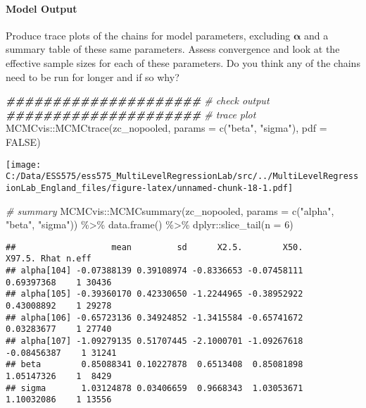 \documentclass[
]{article}
\newenvironment{Shaded}{\begin{snugshade}}{\end{snugshade}}
\newcommand{\AttributeTok}[1]{\textcolor[rgb]{0.77,0.63,0.00}{#1}}
\newcommand{\CommentTok}[1]{\textcolor[rgb]{0.56,0.35,0.01}{\textit{#1}}}
\newcommand{\ConstantTok}[1]{\textcolor[rgb]{0.00,0.00,0.00}{#1}}
\newcommand{\DecValTok}[1]{\textcolor[rgb]{0.00,0.00,0.81}{#1}}
\newcommand{\DocumentationTok}[1]{\textcolor[rgb]{0.56,0.35,0.01}{\textbf{\textit{#1}}}}
\newcommand{\FunctionTok}[1]{\textcolor[rgb]{0.00,0.00,0.00}{#1}}
\newcommand{\NormalTok}[1]{#1}
\newcommand{\SpecialCharTok}[1]{\textcolor[rgb]{0.00,0.00,0.00}{#1}}
\newcommand{\StringTok}[1]{\textcolor[rgb]{0.31,0.60,0.02}{#1}}
\begin{document}
\hypertarget{model-output-1}{%
\paragraph{Model Output}\label{model-output-1}}

Produce trace plots of the chains for model parameters, excluding
\(\boldsymbol{\alpha}\) and a summary table of these same parameters.
Assess convergence and look at the effective sample sizes for each of
these parameters. Do you think any of the chains need to be run for
longer and if so why?

\begin{Shaded}
\begin{Highlighting}[]
\DocumentationTok{\#\#\#\#\#\#\#\#\#\#\#\#\#\#\#\#\#\#\#\#\#}
\CommentTok{\# check output}
\DocumentationTok{\#\#\#\#\#\#\#\#\#\#\#\#\#\#\#\#\#\#\#\#\#}
\CommentTok{\# trace plot}
\NormalTok{MCMCvis}\SpecialCharTok{::}\FunctionTok{MCMCtrace}\NormalTok{(zc\_nopooled, }\AttributeTok{params =} \FunctionTok{c}\NormalTok{(}\StringTok{"beta"}\NormalTok{, }\StringTok{"sigma"}\NormalTok{), }\AttributeTok{pdf =} \ConstantTok{FALSE}\NormalTok{)}
\end{Highlighting}
\end{Shaded}

\texttt{[image: C:/Data/ESS575/ess575\_MultiLevelRegressionLab/src/../MultiLevelRegressionLab\_England\_files/figure-latex/unnamed-chunk-18-1.pdf]}

\begin{Shaded}
\begin{Highlighting}[]
\CommentTok{\# summary}
\NormalTok{MCMCvis}\SpecialCharTok{::}\FunctionTok{MCMCsummary}\NormalTok{(zc\_nopooled, }\AttributeTok{params =} \FunctionTok{c}\NormalTok{(}\StringTok{"alpha"}\NormalTok{, }\StringTok{"beta"}\NormalTok{, }\StringTok{"sigma"}\NormalTok{)) }\SpecialCharTok{\%\textgreater{}\%} 
  \FunctionTok{data.frame}\NormalTok{() }\SpecialCharTok{\%\textgreater{}\%} 
\NormalTok{  dplyr}\SpecialCharTok{::}\FunctionTok{slice\_tail}\NormalTok{(}\AttributeTok{n =} \DecValTok{6}\NormalTok{)}
\end{Highlighting}
\end{Shaded}

\begin{verbatim}
##                   mean         sd      X2.5.        X50.      X97.5. Rhat n.eff
## alpha[104] -0.07388139 0.39108974 -0.8336653 -0.07458111  0.69397368    1 30436
## alpha[105] -0.39360170 0.42330650 -1.2244965 -0.38952922  0.43008892    1 29278
## alpha[106] -0.65723136 0.34924852 -1.3415584 -0.65741672  0.03283677    1 27740
## alpha[107] -1.09279135 0.51707445 -2.1000701 -1.09267618 -0.08456387    1 31241
## beta        0.85088341 0.10227878  0.6513408  0.85081898  1.05147326    1  8429
## sigma       1.03124878 0.03406659  0.9668343  1.03053671  1.10032086    1 13556
\end{verbatim}
\end{document}
